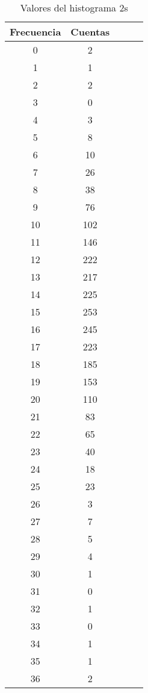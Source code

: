 \begin{center}
\begin{table}[H]
\caption{Valores del histograma 2s}
\label{Tab:histo_2s}
\begin{tabular}{ccccc}
\toprule
Frecuencia & Cuentas \\
\midrule
\num{    0} & \num{    2} \\
\num{    1} & \num{    1} \\
\num{    2} & \num{    2} \\
\num{    3} & \num{    0} \\
\num{    4} & \num{    3} \\
\num{    5} & \num{    8} \\
\num{    6} & \num{   10} \\
\num{    7} & \num{   26} \\
\num{    8} & \num{   38} \\
\num{    9} & \num{   76} \\
\num{   10} & \num{  102} \\
\num{   11} & \num{  146} \\
\num{   12} & \num{  222} \\
\num{   13} & \num{  217} \\
\num{   14} & \num{  225} \\
\num{   15} & \num{  253} \\
\num{   16} & \num{  245} \\
\num{   17} & \num{  223} \\
\num{   18} & \num{  185} \\
\num{   19} & \num{  153} \\
\num{   20} & \num{  110} \\
\num{   21} & \num{   83} \\
\num{   22} & \num{   65} \\
\num{   23} & \num{   40} \\
\num{   24} & \num{   18} \\
\num{   25} & \num{   23} \\
\num{   26} & \num{    3} \\
\num{   27} & \num{    7} \\
\num{   28} & \num{    5} \\
\num{   29} & \num{    4} \\
\num{   30} & \num{    1} \\
\num{   31} & \num{    0} \\
\num{   32} & \num{    1} \\
\num{   33} & \num{    0} \\
\num{   34} & \num{    1} \\
\num{   35} & \num{    1} \\
\num{   36} & \num{    2} \\
\bottomrule
\end{tabular}
\end{table}
\end{center}

